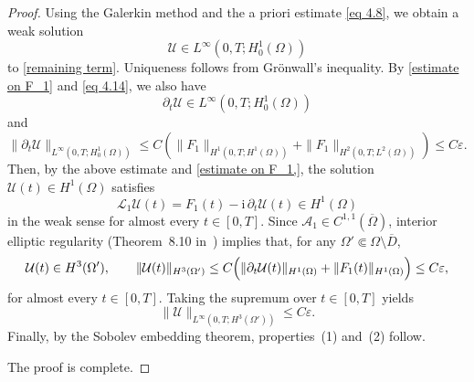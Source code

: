 \documentclass[11pt,reqno,oneside]{amsart}
\numberwithin{equation}{section}
\theoremstyle{definition}
\theoremstyle{remark}
\numberwithin{equation}{section}
\begin{document}
\begin{proof}
		Using the Galerkin method and the a priori estimate \eqref{eq 4.8}, we obtain a weak solution
		\[
		\mathcal{U}\in L^{\infty}(0,T;H^{1}_{0}(\Omega))
		\]
		to \eqref{remaining term}.  
		Uniqueness follows from Grönwall’s inequality. By \eqref{estimate on F_1} and \eqref{eq 4.14}, we also have
		\[
		\partial_t \mathcal{U} \in L^{\infty}(0,T;H_0^{1}(\Omega))
		\]
		and
		\[
		\|\partial_t \mathcal{U}\|_{L^{\infty}(0,T;H_0^{1}(\Omega))}
		\le C\left(
		\|F_1\|_{H^{1}(0,T;H^{1}(\Omega))}
		+\|F_1\|_{H^{2}(0,T;L^{2}(\Omega))}
		\right)
		\le C\varepsilon .
		\]
		Then, by the above estimate and \eqref{estimate on F_1,}, the solution
		$\mathcal{U}(t)\in H^{1}(\Omega)$ satisfies
		\[
		\mathcal{L}_1\mathcal{U}(t)
		=
		F_1(t)-\mathrm{i}\,\partial_t \mathcal{U}(t)
		\in H^{1}(\Omega)
		\]
		in the weak sense for almost every $t\in[0,T]$.
		Since $\mathscr{A}_1\in C^{1,1}(\overline{\Omega})$, interior elliptic
		regularity (Theorem~8.10 in~\cite{GilbargTrudinger}) implies that, for any
		$\Omega'\Subset\Omega\setminus\overline{D}$,
		\[
		\mathcal{U}(t)\in H^{3}(\Omega'),
		\qquad
		\|\mathcal{U}(t)\|_{H^{3}(\Omega')}
		\le C\Bigl(
		\|\partial_t\mathcal{U}(t)\|_{H^{1}(\Omega)}
		+\|F_1(t)\|_{H^{1}(\Omega)}
		\Bigr)
		\le C\varepsilon ,
		\]
		for almost every $t\in[0,T]$.
		Taking the supremum over $t\in[0,T]$ yields
		\[
		\|\mathcal{U}\|_{L^{\infty}(0,T;H^{3}(\Omega'))}
		\le C\varepsilon .
		\]
		Finally, by the Sobolev embedding theorem, properties~(1) and~(2) follow.
		
		
		The proof is complete.
	\end{proof}
	
\end{document}
